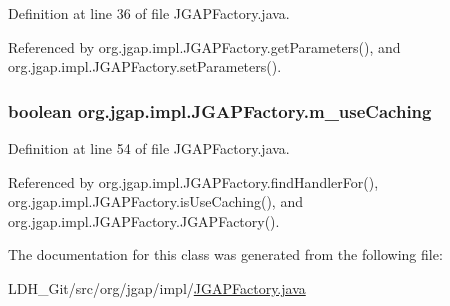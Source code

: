 Definition at line 36 of file J\-G\-A\-P\-Factory.\-java.



Referenced by org.\-jgap.\-impl.\-J\-G\-A\-P\-Factory.\-get\-Parameters(), and org.\-jgap.\-impl.\-J\-G\-A\-P\-Factory.\-set\-Parameters().

\hypertarget{classorg_1_1jgap_1_1impl_1_1_j_g_a_p_factory_a244e1f88d3462188bc600075bdd0854d}{
\subsubsection[{m\-\_\-use\-Caching}]{\setlength{\rightskip}{0pt plus 5cm}boolean org.\-jgap.\-impl.\-J\-G\-A\-P\-Factory.\-m\-\_\-use\-Caching\hspace{0.3cm}{\ttfamily [private]}}}\label{classorg_1_1jgap_1_1impl_1_1_j_g_a_p_factory_a244e1f88d3462188bc600075bdd0854d}


Definition at line 54 of file J\-G\-A\-P\-Factory.\-java.



Referenced by org.\-jgap.\-impl.\-J\-G\-A\-P\-Factory.\-find\-Handler\-For(), org.\-jgap.\-impl.\-J\-G\-A\-P\-Factory.\-is\-Use\-Caching(), and org.\-jgap.\-impl.\-J\-G\-A\-P\-Factory.\-J\-G\-A\-P\-Factory().



The documentation for this class was generated from the following file\-:\begin{DoxyCompactItemize}
\item 
L\-D\-H\-\_\-\-Git/src/org/jgap/impl/\hyperlink{_j_g_a_p_factory_8java}{J\-G\-A\-P\-Factory.\-java}\end{DoxyCompactItemize}
